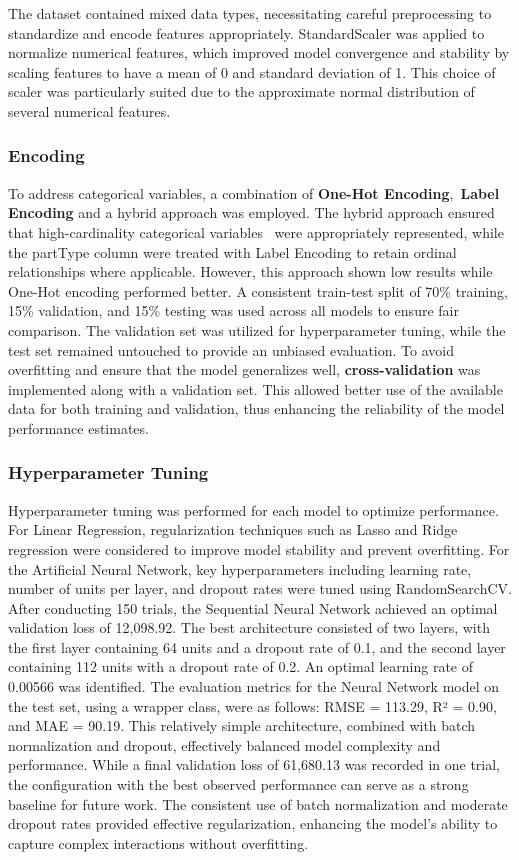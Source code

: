 \documentclass{article}
\begin{document}
The dataset contained mixed data types, necessitating careful preprocessing to standardize and encode features appropriately. StandardScaler was applied to normalize numerical features, which improved model convergence and stability by scaling features to have a mean of 0 and standard deviation of 1. This choice of scaler was particularly suited due to the approximate normal distribution of several numerical features.

\subsubsection{Encoding}

To address categorical variables, a combination of \textbf{One-Hot Encoding}, \textbf{Label Encoding} and a hybrid approach was employed. The hybrid approach ensured that high-cardinality categorical variables  were appropriately represented, while the partType column were treated with Label Encoding to retain ordinal relationships where applicable. However, this approach shown low results while One-Hot encoding performed better. A consistent train-test split of 70\% training, 15\% validation, and 15\% testing was used across all models to ensure fair comparison. The validation set was utilized for hyperparameter tuning, while the test set remained untouched to provide an unbiased evaluation.
To avoid overfitting and ensure that the model generalizes well, \textbf{cross-validation} was implemented along with a validation set. This allowed better use of the available data for both training and validation, thus enhancing the reliability of the model performance estimates.

\subsubsection{Hyperparameter Tuning}

Hyperparameter tuning was performed for each model to optimize performance. For Linear Regression, regularization techniques such as Lasso and Ridge regression were considered to improve model stability and prevent overfitting. For the Artificial Neural Network, key hyperparameters including learning rate, number of units per layer, and dropout rates were tuned using RandomSearchCV. After conducting 150 trials, the Sequential Neural Network achieved an optimal validation loss of 12,098.92. The best architecture consisted of two layers, with the first layer containing 64 units and a dropout rate of 0.1, and the second layer containing 112 units with a dropout rate of 0.2. An optimal learning rate of 0.00566 was identified. The evaluation metrics for the Neural Network model on the test set, using a wrapper class, were as follows: RMSE = 113.29, R² = 0.90, and MAE = 90.19. This relatively simple architecture, combined with batch normalization and dropout, effectively balanced model complexity and performance. While a final validation loss of 61,680.13 was recorded in one trial, the configuration with the best observed performance can serve as a strong baseline for future work. The consistent use of batch normalization and moderate dropout rates provided effective regularization, enhancing the model's ability to capture complex interactions without overfitting.
\end{document}
